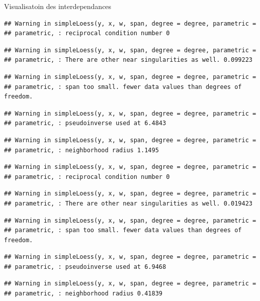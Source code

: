 \documentclass[11pt,ignorenonframetext,]{beamer}
\begin{document}
\begin{frame}[fragile]{Visualisatoin des interdependances}
\begin{verbatim}
## Warning in simpleLoess(y, x, w, span, degree = degree, parametric =
## parametric, : reciprocal condition number 0
\end{verbatim}

\begin{verbatim}
## Warning in simpleLoess(y, x, w, span, degree = degree, parametric =
## parametric, : There are other near singularities as well. 0.099223
\end{verbatim}

\begin{verbatim}
## Warning in simpleLoess(y, x, w, span, degree = degree, parametric =
## parametric, : span too small. fewer data values than degrees of freedom.
\end{verbatim}

\begin{verbatim}
## Warning in simpleLoess(y, x, w, span, degree = degree, parametric =
## parametric, : pseudoinverse used at 6.4843
\end{verbatim}

\begin{verbatim}
## Warning in simpleLoess(y, x, w, span, degree = degree, parametric =
## parametric, : neighborhood radius 1.1495
\end{verbatim}

\begin{verbatim}
## Warning in simpleLoess(y, x, w, span, degree = degree, parametric =
## parametric, : reciprocal condition number 0
\end{verbatim}

\begin{verbatim}
## Warning in simpleLoess(y, x, w, span, degree = degree, parametric =
## parametric, : There are other near singularities as well. 0.019423
\end{verbatim}

\begin{verbatim}
## Warning in simpleLoess(y, x, w, span, degree = degree, parametric =
## parametric, : span too small. fewer data values than degrees of freedom.
\end{verbatim}

\begin{verbatim}
## Warning in simpleLoess(y, x, w, span, degree = degree, parametric =
## parametric, : pseudoinverse used at 6.9468
\end{verbatim}

\begin{verbatim}
## Warning in simpleLoess(y, x, w, span, degree = degree, parametric =
## parametric, : neighborhood radius 0.41839
\end{verbatim}


\end{frame}
\end{document}
